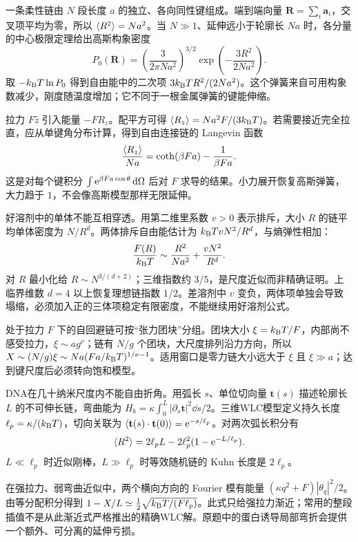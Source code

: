 一条柔性链由 $N$ 段长度 $a$ 的独立、各向同性键组成。端到端向量 $\mathbf R=\sum_i\mathbf a_i$，交叉项平均为零，所以 $\langle R^2\rangle=Na^2$。当 $N\gg1$、延伸远小于轮廓长 $Na$ 时，各分量的中心极限定理给出高斯构象密度
\[
P_0(\mathbf R)=\left(\frac3{2\pi Na^2}\right)^{3/2}\exp\!\left(-\frac{3R^2}{2Na^2}\right).
\]
取 $-k_{\mathrm B} T\ln P_0$ 得到自由能中的二次项 $3k_{\mathrm B} TR^2/(2Na^2)$。这个弹簧来自可用构象数减少，刚度随温度增加；它不同于一根金属弹簧的键能伸缩。

拉力 $F\hat z$ 引入能量 $-FR_z$。配平方可得 $\langle R_z\rangle=Na^2F/(3k_{\mathrm B} T)$。若需要接近完全拉直，应从单键角分布计算，得到自由连接链的 Langevin 函数
\[
\frac{\langle R_z\rangle}{Na}=\coth(\beta Fa)-\frac1{\beta Fa}.
\]
这是对每个键积分 $\int\mathrm e^{\beta Fa\cos\theta}\,\mathrm d\Omega$ 后对 $F$ 求导的结果。小力展开恢复高斯弹簧，大力趋于 $1$，不会像高斯模型那样无限延伸。

好溶剂中的单体不能互相穿透。用第二维里系数 $v>0$ 表示排斥，大小 $R$ 的链平均单体密度为 $N/R^d$。两体排斥自由能估计为 $k_{\mathrm B} T vN^2/R^d$，与熵弹性相加：
\[
\frac{F(R)}{k_{\mathrm B} T}\sim\frac{R^2}{Na^2}+\frac{vN^2}{R^d}.
\]
对 $R$ 最小化给 $R\sim N^{3/(d+2)}$；三维指数约 $3/5$，是尺度近似而非精确证明。上临界维数 $d=4$ 以上恢复理想链指数 $1/2$。差溶剂中 $v$ 变负，两体项单独会导致塌缩，必须加入正的三体项稳定有限密度，不能继续用好溶剂公式。

处于拉力 $F$ 下的自回避链可按“张力团块”分组。团块大小 $\xi=k_{\mathrm B} T/F$，内部尚不感受拉力，$\xi\sim a g^\nu$；链有 $N/g$ 个团块，大尺度排列沿力方向，所以 $X\sim(N/g)\xi\sim Na(Fa/k_{\mathrm B} T)^{1/\nu-1}$。适用窗口是零力链大小远大于 $\xi$ 且 $\xi\gg a$；达到键尺度后必须转向饱和模型。

DNA在几十纳米尺度内不能自由折角。用弧长 $s$、单位切向量 $\mathbf t(s)$ 描述轮廓长 $L$ 的不可伸长链，弯曲能为 $H_b=\kappa\int_0^L|\partial_s\mathbf t|^2\dd s/2$。三维WLC模型定义持久长度 $\ell_p=\kappa/(k_{\mathrm B} T)$，切向关联为 $\langle \mathbf t(s)\cdot\mathbf t(0)\rangle=\mathrm e^{-s/\ell_p}$。对两次弧长积分有
\[
\langle R^2\rangle=2\ell_pL-2\ell_p^2(1-\mathrm e^{-L/\ell_p}).
\]
$L\ll\ell_p$ 时近似刚棒，$L\gg\ell_p$ 时等效随机链的 Kuhn 长度是 $2\ell_p$。

在强拉力、弱弯曲近似中，两个横向方向的 Fourier 模有能量 $(\kappa q^2+F)|\theta_q|^2/2$。由等分配积分得到 $1-X/L\simeq\tfrac12\sqrt{k_{\mathrm B} T/(F\ell_p)}$。此式只给强拉力渐近；常用的整段插值不是从此渐近式严格推出的精确WLC解。原题中的蛋白诱导局部弯折会提供一个额外、可分离的延伸亏损。

